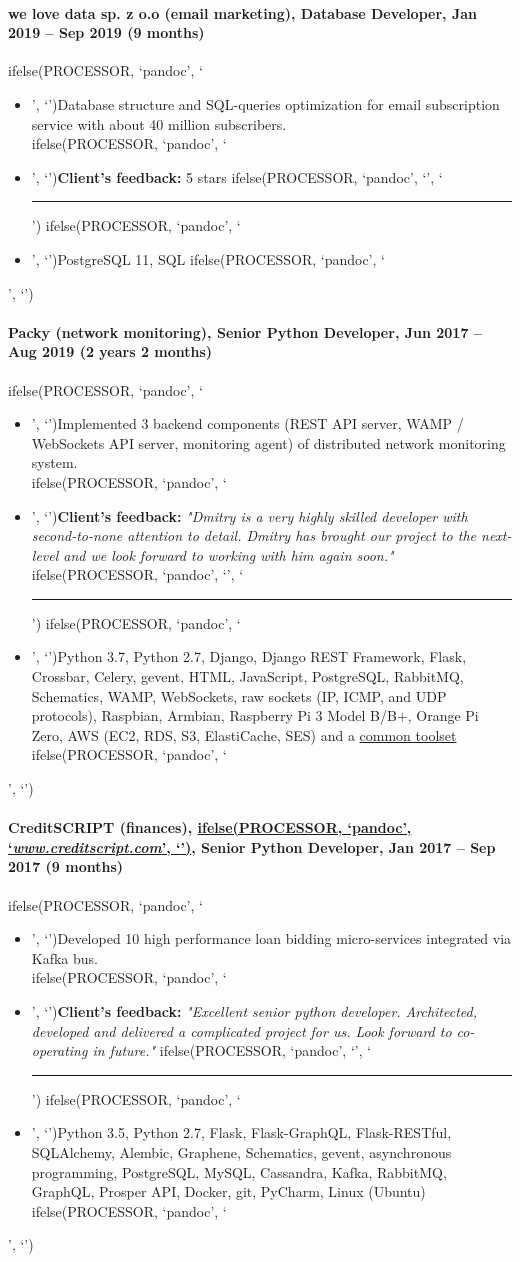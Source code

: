 \documentclass[a4paper,8pt]{extarticle}
\newcommand{\chref}[2]{\href{#1}
{ifelse(PROCESSOR, `pandoc', `#2', `\underline{\smash{#2}}')}}
\newcommand{\itchref}[2]{\chref{#1}{\textit{#2}}}  %
\newcommand{\chrule}{ifelse(PROCESSOR, `pandoc', `', `\vspace{3pt}\hrule')}
\newcommand{\pdbeginitemize}{ifelse(PROCESSOR, `pandoc', `\begin{itemize}', `')}
\newcommand{\pditem}{ifelse(PROCESSOR, `pandoc', `\item', `')}
\newcommand{\pdenditemize}{ifelse(PROCESSOR, `pandoc', `\end{itemize}', `')}
\begin{document}
\paragraph*{we love data sp. z o.o (email marketing), Database Developer, Jan 2019 -- Sep 2019 (9 months)}
\pdbeginitemize
\pditem Database structure and SQL-queries optimization for email subscription service with about 40 million subscribers.\\
\pditem \textbf{Client's feedback:} 5 stars
\chrule
\pditem PostgreSQL 11, SQL
\pdenditemize

\paragraph*{Packy (network monitoring), \textbf{Senior Python Developer}, Jun 2017 -- Aug 2019 (2 years 2 months)}
\pdbeginitemize
\pditem Implemented 3 backend components (REST API server, WAMP / WebSockets API server, monitoring agent) of distributed network monitoring system.\\
\pditem \textbf{Client's feedback:} \textit{"Dmitry is a very highly skilled developer with second-to-none attention to detail. Dmitry has brought our project to the next-level and we look forward to working with him again soon."}
\chrule
\pditem Python 3.7, Python 2.7, Django, Django REST Framework, Flask, Crossbar, Celery, gevent, HTML, JavaScript, PostgreSQL, RabbitMQ, Schematics, WAMP, WebSockets, raw sockets (IP, ICMP, and UDP protocols), Raspbian, Armbian, Raspberry Pi 3 Model B/B+, Orange Pi Zero, AWS (EC2, RDS, S3, ElastiCache, SES) and a \hyperlink{common-toolset}{common toolset}
\pdenditemize

\paragraph*{CreditSCRIPT (finances), \itchref{https://www.creditscript.com}{www.creditscript.com}, Senior Python Developer, Jan 2017 -- Sep 2017 (9 months)}
\pdbeginitemize
\pditem Developed 10 high performance loan bidding micro-services integrated via Kafka bus.\\
\pditem \textbf{Client's feedback:} \textit{"Excellent senior python developer. Architected, developed and delivered a complicated project for us. Look forward to co-operating in future."}
\chrule
\pditem Python 3.5, Python 2.7, Flask, Flask-GraphQL, Flask-RESTful, SQLAlchemy, Alembic, Graphene, Schematics, gevent, asynchronous programming, PostgreSQL, MySQL, Cassandra, Kafka, RabbitMQ, GraphQL, Prosper API, Docker, git, PyCharm, Linux (Ubuntu)
\pdenditemize
\end{document}
